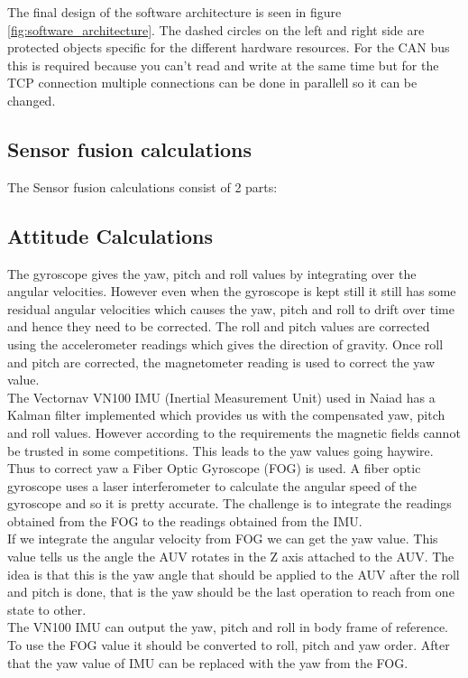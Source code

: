 The final design of the software architecture is seen in figure \ref{fig:software_architecture}.
The dashed circles on the left and right side are protected objects specific for
the different hardware resources. For the CAN bus this is required because you
can't read and write at the same time but for the TCP connection multiple connections
can be done in parallell so it can be changed.


\subsection{Sensor fusion calculations}
The Sensor fusion calculations consist of 2 parts:
\subsection{Attitude Calculations}
The gyroscope gives the yaw, pitch and roll values by integrating over the angular velocities. However even when the gyroscope is kept still it still has some residual angular velocities which causes the yaw, pitch and roll to drift over time and hence they need to be corrected. The roll and pitch values are corrected using the accelerometer readings which gives the direction of gravity. Once roll and pitch are corrected, the magnetometer reading is used to correct the yaw value. \\
The Vectornav VN100 IMU (Inertial Measurement Unit) used in Naiad has a Kalman filter implemented which provides us with the compensated yaw, pitch and roll values. However according to the requirements the magnetic fields cannot be trusted in some competitions. This leads to the yaw values going haywire. \\
Thus to correct yaw a Fiber Optic Gyroscope (FOG) is used. A fiber optic gyroscope uses a laser interferometer to calculate the angular speed of the gyroscope and so it is pretty accurate. The challenge is to integrate the readings obtained from the FOG to the readings obtained from the IMU.\\
If we integrate the angular velocity from FOG we can get the yaw value. This value tells us the angle the AUV rotates in the Z axis attached to the AUV. The idea is that this is the yaw angle that should be applied to the AUV after the roll and pitch is done, that is the yaw should be the last operation to reach from one state to other. \\
The VN100 IMU can output the yaw, pitch and roll in body frame of reference. To use the FOG value it should be converted to roll, pitch and yaw order. After that the yaw value of IMU can be replaced with the yaw from the FOG.\\

